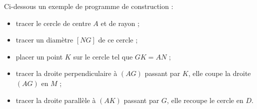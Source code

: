   Ci-dessous un exemple de programme de construction :
   \begin{itemize}
      \item tracer le cercle de centre $A$ et de rayon  ;
      \item tracer un diamètre $[NG]$ de ce cercle ;
      \item placer un point $K$ sur le cercle tel que $GK = AN$ ;
      \item tracer la droite perpendiculaire à $(AG)$ passant par $K$, elle coupe la droite $(AG)$ en $M$ ;
      \item tracer la droite parallèle à $(AK)$ passant par $G$, elle recoupe le cercle en $D$.
   \end{itemize}
